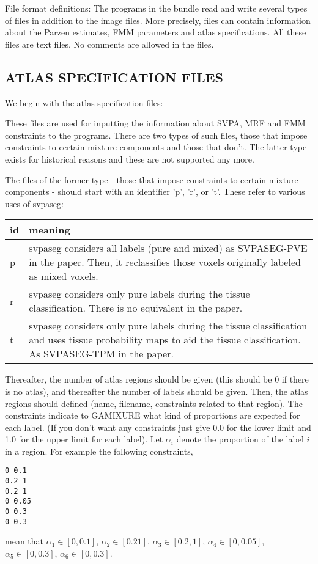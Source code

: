 \documentclass[12pt]{article}
\begin{document}
File format definitions: The programs in the bundle read and write several
types of files in addition to the image files. More precisely, files
can contain information about the Parzen estimates, FMM parameters and
atlas specifications. All these files are text files. No comments are
allowed in the files.

\subsection{ATLAS SPECIFICATION FILES}
We begin with the atlas specification files:

These files are used for inputting the information about SVPA, MRF and
FMM constraints to the programs. There are two types of such files,
those that impose constraints to certain mixture components and those
that don't. The latter type exists for historical reasons and these are not supported any more.

The files of the former type - those that impose constraints to certain mixture components - 
should start with an identifier 'p', 'r', or 't'. These refer to various uses of svpaseg:

\begin{tabular}{|l|p{10cm}|} \hline
id & meaning \\ \hline
p & svpaseg considers all labels (pure and mixed) as SVPASEG-PVE in the paper. Then, it reclassifies those voxels originally labeled as mixed voxels.  \\
r & svpaseg considers only pure labels during the tissue classification. There is no equivalent in the paper. \\
t & svpaseg considers only pure labels during the tissue classification and uses tissue probability maps to aid the tissue classification. As SVPASEG-TPM in the paper. \\ \hline
\end{tabular}


Thereafter, the number of atlas regions should be given (this
should be 0 if there is no atlas), and thereafter the number of labels
should be given. Then, the atlas regions should defined (name,
filename, constraints related to that region). The constraints indicate to GAMIXURE what kind of proportions are expected for each label. (If you don't want any constraints just give 0.0 for the lower
limit and 1.0 for the upper limit for each label). Let $\alpha_i$ denote the proportion of the label $i$ in a region. For example the following constraints,
\begin{verbatim}
0 0.1
0.2 1
0.2 1
0 0.05
0 0.3
0 0.3
\end{verbatim}
mean that $\alpha_1 \in [0,0.1]$, $\alpha_2 \in [0.2 1]$, $\alpha_3 \in [0.2,1]$, $\alpha_4 \in [0,0.05]$, $\alpha_5 \in [0,0.3]$, $\alpha_6 \in [0,0.3]$.    
\end{document}
